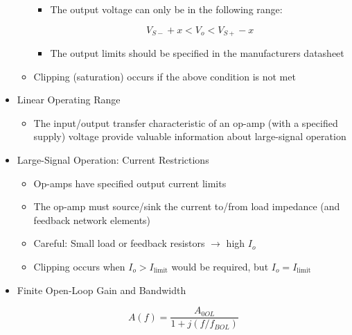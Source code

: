 \begin{itemize}
\begin{itemize}
\begin{itemize}
          \item The output voltage can only be in the following range:

            $$V_{S-}+x<V_o<V_{S+}-x$$

          \item The output limits should be specified in the manufacturers datasheet

        \end{itemize}

      \item Clipping (saturation) occurs if the above condition is not met

    \end{itemize}

  \item Linear Operating Range

    \begin{itemize}

      \item The input/output transfer characteristic of an op-amp (with a specified supply) voltage provide valuable information about large-signal operation

    \end{itemize}

  \item Large-Signal Operation: Current Restrictions

    \begin{itemize}

      \item Op-amps have specified output current limits

      \item The op-amp must source/sink the current to/from load impedance (and feedback network elements)

      \item Careful: Small load or feedback resistors $\to$ high $I_o$


      \item Clipping occurs when $I_o>I_{\text{limit}}$ would be required, but $I_o=I_{\text{limit}}$

    \end{itemize}

  \item Finite Open-Loop Gain and Bandwidth

    $$A(f)=\frac{A_{0OL}}{1+j(f/f_{BOL})}$$

    \begin{itemize}


\end{itemize}
\end{itemize}

